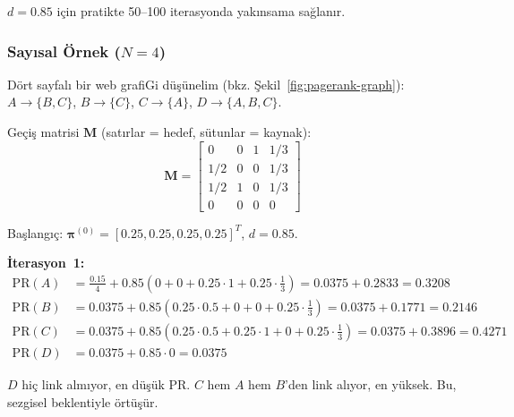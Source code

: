 \noindent
$d = 0.85$ i\c{c}in pratikte 50--100 iterasyonda yak{\i}nsama sa\u{g}lan{\i}r.

\subsubsection{Say{\i}sal \"{O}rnek ($N = 4$)}

D\"{o}rt sayfal{\i} bir web grafiGi d\"{u}\c{s}\"{u}nelim (bkz. \c{S}ekil~\ref{fig:pagerank-graph}): $A \to \{B, C\}$, $B \to \{C\}$, $C \to \{A\}$, $D \to \{A, B, C\}$.

\begin{ornek}
Ge\c{c}i\c{s} matrisi $\mathbf{M}$ (sat{\i}rlar = hedef, s\"{u}tunlar = kaynak):
\[
\mathbf{M} = \begin{bmatrix}
0 & 0 & 1 & 1/3 \\
1/2 & 0 & 0 & 1/3 \\
1/2 & 1 & 0 & 1/3 \\
0 & 0 & 0 & 0
\end{bmatrix}
\]

Ba\c{s}lang{\i}\c{c}: $\boldsymbol{\pi}^{(0)} = [0.25, 0.25, 0.25, 0.25]^T$, $d = 0.85$.

\textbf{\.{I}terasyon~1:}
\begin{align*}
\text{PR}(A) &= \frac{0.15}{4} + 0.85\!\left(0 + 0 + 0.25 \cdot 1 + 0.25 \cdot \frac{1}{3}\right) = 0.0375 + 0.2833 = 0.3208 \\
\text{PR}(B) &= 0.0375 + 0.85\!\left(0.25 \cdot 0.5 + 0 + 0 + 0.25 \cdot \frac{1}{3}\right) = 0.0375 + 0.1771 = 0.2146 \\
\text{PR}(C) &= 0.0375 + 0.85\!\left(0.25 \cdot 0.5 + 0.25 \cdot 1 + 0 + 0.25 \cdot \frac{1}{3}\right) = 0.0375 + 0.3896 = 0.4271 \\
\text{PR}(D) &= 0.0375 + 0.85 \cdot 0 = 0.0375
\end{align*}

$D$ hi\c{c} link alm{\i}yor, en d\"{u}\c{s}\"{u}k PR. $C$ hem $A$ hem $B$'den link al{\i}yor, en y\"{u}ksek. Bu, sezgisel beklentiyle \"{o}rt\"{u}\c{s}\"{u}r.
\end{ornek}

